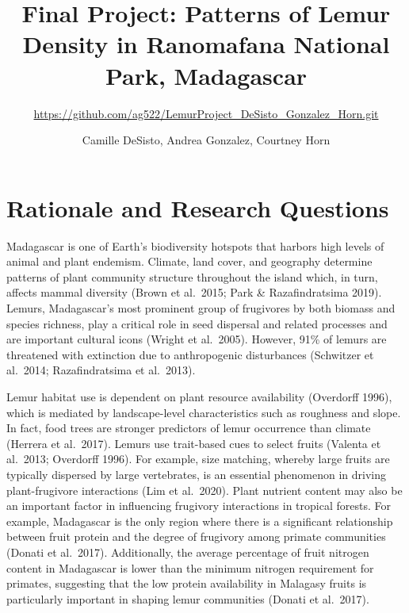 \documentclass[
  12pt,
]{article}
\title{Final Project: Patterns of Lemur Density in Ranomafana National
Park, Madagascar}
\subtitle{\url{https://github.com/ag522/LemurProject_DeSisto_Gonzalez_Horn.git}}
\author{Camille DeSisto, Andrea Gonzalez, Courtney Horn}
\date{}
\begin{document}
\maketitle

\newpage
\tableofcontents 
\newpage
\listoftables 
\newpage
\listoffigures 
\newpage

\hypertarget{rationale-and-research-questions}{%
\section{Rationale and Research
Questions}\label{rationale-and-research-questions}}

Madagascar is one of Earth's biodiversity hotspots that harbors high
levels of animal and plant endemism. Climate, land cover, and geography
determine patterns of plant community structure throughout the island
which, in turn, affects mammal diversity (Brown et al.~2015; Park \&
Razafindratsima 2019). Lemurs, Madagascar's most prominent group of
frugivores by both biomass and species richness, play a critical role in
seed dispersal and related processes and are important cultural icons
(Wright et al.~2005). However, 91\% of lemurs are threatened with
extinction due to anthropogenic disturbances (Schwitzer et al.~2014;
Razafindratsima et al.~2013).

Lemur habitat use is dependent on plant resource availability (Overdorff
1996), which is mediated by landscape-level characteristics such as
roughness and slope. In fact, food trees are stronger predictors of
lemur occurrence than climate (Herrera et al.~2017). Lemurs use
trait-based cues to select fruits (Valenta et al.~2013; Overdorff 1996).
For example, size matching, whereby large fruits are typically dispersed
by large vertebrates, is an essential phenomenon in driving
plant-frugivore interactions (Lim et al.~2020). Plant nutrient content
may also be an important factor in influencing frugivory interactions in
tropical forests. For example, Madagascar is the only region where there
is a significant relationship between fruit protein and the degree of
frugivory among primate communities (Donati et al.~2017). Additionally,
the average percentage of fruit nitrogen content in Madagascar is lower
than the minimum nitrogen requirement for primates, suggesting that the
low protein availability in Malagasy fruits is particularly important in
shaping lemur communities (Donati et al.~2017).
\end{document}
